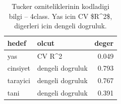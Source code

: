 \begin{table}[htbp]
  \centering
  \caption{Tucker ozniteliklerinin kodladigi bilgi -- 4class. Yas icin CV \$R\textasciicircum{}2\$, digerleri icin dengeli dogruluk.}
  \label{tab:content_4class}
  \small
  \begin{tabular}{llr}
    \toprule
    hedef & olcut & deger \\
    \midrule
    yas & CV R\textasciicircum{}2 & 0.049 \\
    cinsiyet & dengeli dogruluk & 0.793 \\
    tarayici & dengeli dogruluk & 0.767 \\
    tani & dengeli dogruluk & 0.391 \\
    \bottomrule
  \end{tabular}
\end{table}
